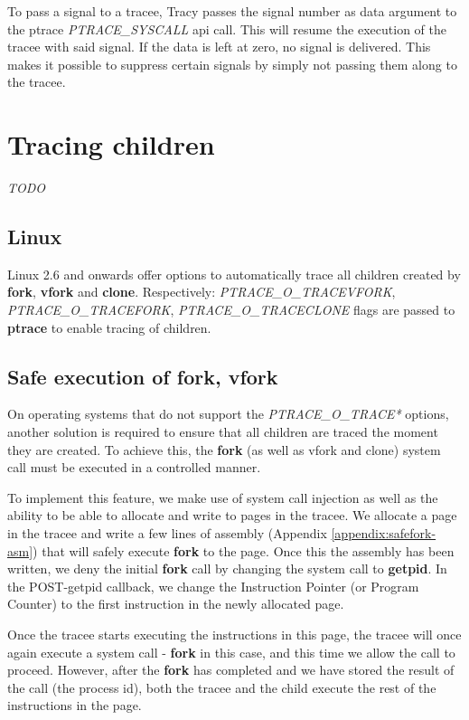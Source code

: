\documentclass[a4paper, 10pt]{report}
\begin{document}
To pass a signal to a tracee, Tracy passes the signal number as data
argument to the ptrace \textit{PTRACE\_SYSCALL} api call. This will
resume the execution of the tracee with said signal. If the data is
left at zero, no signal is delivered. This makes it possible to
suppress certain signals by simply not passing them along to the tracee.


\section{Tracing children}

\textit{TODO}

\subsection{Linux}

Linux 2.6 and onwards offer options to automatically trace all children
created by \textbf{fork}, \textbf{vfork} and \textbf{clone}.
Respectively: \textit{PTRACE\_O\_TRACEVFORK}, \textit{PTRACE\_O\_TRACEFORK},
\textit{PTRACE\_O\_TRACECLONE} flags are passed to \textbf{ptrace} to enable
tracing of children.

\subsection{Safe execution of fork, vfork}
\label{safe-fork}

On operating systems that do not support the \textit{PTRACE\_O\_TRACE*} options,
another solution is required to ensure that all children are traced the moment
they are created. To achieve this, the \textbf{fork}
(as well as vfork and clone) system call must be executed in a
controlled manner.

To implement this feature, we make use of system call injection as well as the
ability to be able to allocate and write to pages in the tracee. We allocate a
page in the tracee and write a few lines of assembly (Appendix
\ref{appendix:safefork-asm}) that will safely execute
\textbf{fork} to the page.
Once this the assembly has been written, we deny the initial
\textbf{fork} call by changing the system call to \textbf{getpid}.
In the POST-getpid callback, we change the Instruction Pointer
(or Program Counter) to the first instruction in the newly allocated page.

Once the tracee starts executing the instructions in this
page, the tracee will once again execute a system call -
\textbf{fork} in this case, and this time we allow the call to proceed.
However, after the \textbf{fork} has completed
and we have stored the result of the call (the process id), both the tracee
and the child execute the rest of the instructions in the page.
\end{document}
